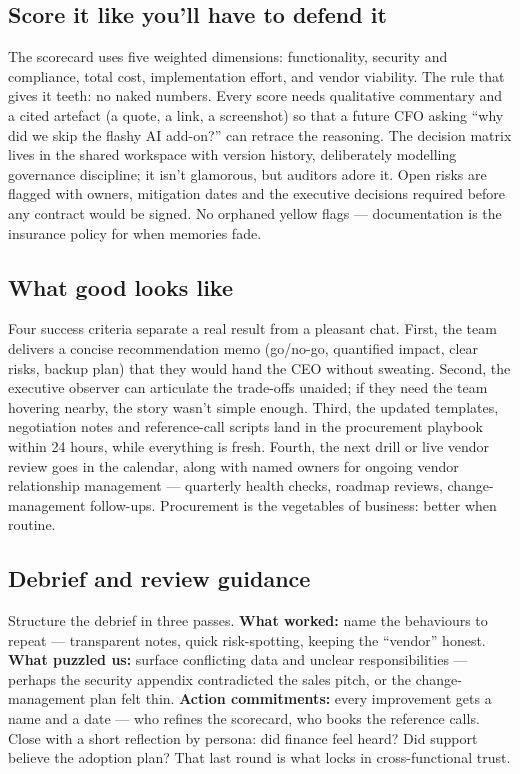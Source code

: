 \subsection{Score it like you'll have to defend it}


The scorecard uses five weighted dimensions: functionality, security and compliance, total cost, implementation effort, and vendor viability. The rule that gives it teeth: no naked numbers. Every score needs qualitative commentary and a cited artefact (a quote, a link, a screenshot) so that a future CFO asking ``why did we skip the flashy AI add-on?'' can retrace the reasoning. The decision matrix lives in the shared workspace with version history, deliberately modelling governance discipline; it isn't glamorous, but auditors adore it. Open risks are flagged with owners, mitigation dates and the executive decisions required before any contract would be signed. No orphaned yellow flags — documentation is the insurance policy for when memories fade.



\subsection{What good looks like}


Four success criteria separate a real result from a pleasant chat. First, the team delivers a concise recommendation memo (go/no-go, quantified impact, clear risks, backup plan) that they would hand the CEO without sweating. Second, the executive observer can articulate the trade-offs unaided; if they need the team hovering nearby, the story wasn't simple enough. Third, the updated templates, negotiation notes and reference-call scripts land in the procurement playbook within 24 hours, while everything is fresh. Fourth, the next drill or live vendor review goes in the calendar, along with named owners for ongoing vendor relationship management — quarterly health checks, roadmap reviews, change-management follow-ups. Procurement is the vegetables of business: better when routine.



\subsection{Debrief and review guidance}


Structure the debrief in three passes. \textbf{What worked:} name the behaviours to repeat — transparent notes, quick risk-spotting, keeping the ``vendor'' honest. \textbf{What puzzled us:} surface conflicting data and unclear responsibilities — perhaps the security appendix contradicted the sales pitch, or the change-management plan felt thin. \textbf{Action commitments:} every improvement gets a name and a date — who refines the scorecard, who books the reference calls. Close with a short reflection by persona: did finance feel heard? Did support believe the adoption plan? That last round is what locks in cross-functional trust.



